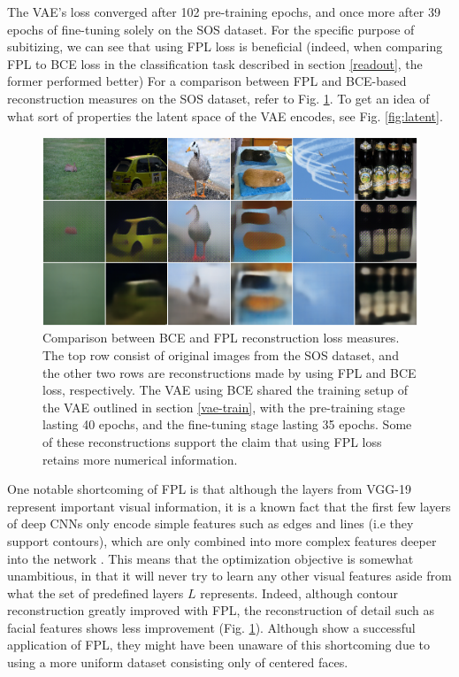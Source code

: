 \documentclass[twocolumn]{article}
\begin{document}
The VAE's loss converged after 102 pre-training epochs, and once more after 39 epochs of fine-tuning solely on the SOS dataset. For the specific purpose of subitizing, we can see that using FPL loss
is beneficial (indeed, when comparing FPL to BCE loss in the classification task described in
section \ref{readout}, the former performed better) For a
comparison between FPL and BCE-based reconstruction measures on the SOS
dataset, refer to Fig. \ref{fig:dfc_comp}. To get an idea of what sort of
properties the latent space of the VAE encodes, see Fig. \ref{fig:latent}.

\begin{figure}
\centering
\includegraphics{dfc_bce.png}
\caption{Comparison between BCE and FPL reconstruction loss measures. The top row consist of original images from the SOS dataset, and the other two rows are reconstructions made by using FPL and BCE loss, respectively. The VAE using BCE shared the training setup of the VAE outlined in section \ref{vae-train}, with the pre-training stage lasting 40 epochs, and the fine-tuning stage lasting 35 epochs. Some of these reconstructions support the claim that using FPL loss retains more numerical information.}
\label{fig:dfc_comp}
\end{figure}

One notable shortcoming of FPL is that although the
layers from VGG-19 represent important visual information, it is a known
fact that the first few layers of deep CNNs only encode simple features
such as edges and lines (i.e they support contours), which are only
combined into more complex features deeper into the network
\citetext{\citealp{liu2017towards}; \citealp[FPL's authors][ note
something similar]{hou2017deep}}. This means that the optimization
objective is somewhat unambitious, in that it will never try to learn
any other visual features \citep[for examples, refer to][Fig.
6.]{liu2017towards} aside from what the set of predefined layers \(L\)
represents. Indeed, although contour reconstruction greatly improved
with FPL, the reconstruction of detail such as facial features shows
less improvement (Fig. \ref{fig:dfc_comp}). Although \citet{hou2017deep} show a successful
application of FPL, they might have been unaware of this shortcoming due
to using a more uniform dataset consisting only of centered faces. 
\end{document}
